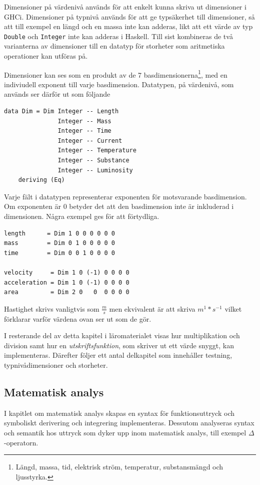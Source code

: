 Dimensioner på värdenivå används för att enkelt kunna skriva ut dimensioner i
GHCi. Dimensioner på typnivå används för att ge typsäkerhet till dimensioner, så
att till exempel en längd och en massa inte kan adderas, likt att ett värde av
typ \texttt{Double} och \texttt{Integer} inte kan adderas i Haskell. Till sist
kombineras de två varianterna av dimensioner till en datatyp för storheter som
aritmetiska operationer kan utföras på.

Dimensioner kan ses som en produkt av de 7 basdimensionerna\footnote{Längd,
massa, tid, elektrisk ström, temperatur, substansmängd och ljusstyrka.}, med en
indiviudell exponent till varje basdimension. Datatypen, på värdenivå, som
används ser därför ut som följande

\begin{lstlisting}
data Dim = Dim Integer -- Length
               Integer -- Mass
               Integer -- Time
               Integer -- Current
               Integer -- Temperature
               Integer -- Substance
               Integer -- Luminosity
    deriving (Eq)
\end{lstlisting}

Varje fält i datatypen representerar exponenten för motsvarande basdimension. Om
exponenten är $0$ betyder det att den basdimension inte är inkluderad i
dimensionen. Några exempel ges för att förtydliga.

\begin{lstlisting}
length      = Dim 1 0 0 0 0 0 0
mass        = Dim 0 1 0 0 0 0 0
time        = Dim 0 0 1 0 0 0 0

velocity     = Dim 1 0 (-1) 0 0 0 0
acceleration = Dim 1 0 (-1) 0 0 0 0
area         = Dim 2 0   0  0 0 0 0
\end{lstlisting}

Hastighet skrivs vanligtvis som $\frac{m}{s}$ men ekvivalent är att skriva
$m^1*s^{-1}$ vilket förklarar varför värdena ovan ser ut som de gör.

I resterande del av detta kapitel i läromaterialet visas hur multiplikation och
division samt hur en \textit{utskriftsfunktion}, som skriver ut ett värde
snyggt, kan implementeras. Därefter följer ett antal delkapitel som innehåller
testning, typnivådimensioner och storheter.

\subsection{Matematisk analys}

I kapitlet om matematisk analys skapas en syntax för funktionsuttryck och symboliskt derivering och integrering implementeras. Dessutom analyseras syntax och semantik hos uttryck som dyker upp inom matematisk analys, till exempel $\Delta$-operatorn.

